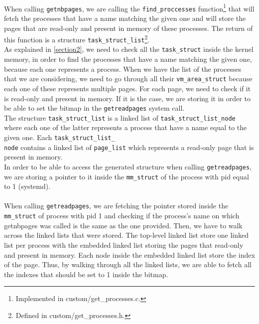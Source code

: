 \documentclass[a4paper, 11pt, oneside]{article}
\begin{document}
\paragraph{}When calling \texttt{getnbpages}, we are calling the \texttt{find\_proccesses} function\footnote{Implemented in custom/get\_processes.c.} that will fetch the processes that have a name matching the given one and will store the pages that are read-only and present in memory of these processes. The return of this function is a structure \texttt{task\_struct\_list}\footnote{Defined in custom/get\_processes.h.}.\\
As explained in \autoref{section2}, we need to check all the \texttt{task\_struct} inside the kernel memory, in order to find the processes that have a name matching the given one, because each one represents a process. When we have the list of the processes that we are considering, we need to go through all their \texttt{vm\_area\_struct} because each one of these represents multiple pages. For each page, we need to check if it is read-only and present in memory. If it is the case, we are storing it in order to be able to set the bitmap in the \texttt{getreadpages} system call.\\
The structure \texttt{task\_struct\_list} is a linked list of \texttt{task\_struct\_list\_node} where each one of the latter represents a process that have a name equal to the given one. Each \texttt{task\_struct\_list\_\\node} contains a linked list of \texttt{page\_list} which represents a read-only page that is present in memory.\\
In order to be able to access the generated structure when calling \texttt{getreadpages}, we are storing a pointer to it inside the \texttt{mm\_struct} of the process with pid equal to 1 (systemd).

\paragraph{}When calling \texttt{getreadpages}, we are fetching the pointer stored inside the \texttt{mm\_struct} of process with pid 1 and checking if the process's name on which getnbpages was called is the same as the one provided. Then, we have to walk across the linked lists that were stored. The top-level linked list store one linked list per process with the embedded linked list storing the pages that read-only and present in memory. Each node inside the embedded linked list store the index of the page. Thus, by walking through all the linked lists, we are able to fetch all the indexes that should be set to 1 inside the bitmap.
\end{document}
